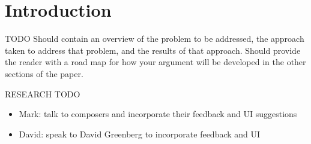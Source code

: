 \documentclass[final,authoryear,11pt,times]{elsarticle}
\begin{document}
\section{Introduction}
\label{sec:introduction}
TODO  Should contain an overview of the problem to be addressed, the approach taken to   
  address that problem, and the results of that approach. Should provide the reader with a  
  road map for how your argument will be developed in the other sections of the paper.


RESEARCH TODO
\begin{itemize}
\item Mark: talk to composers and incorporate their feedback and UI suggestions
\item David: speak to David Greenberg to incorporate feedback and UI
\end{itemize}

%
%




\end{document}
